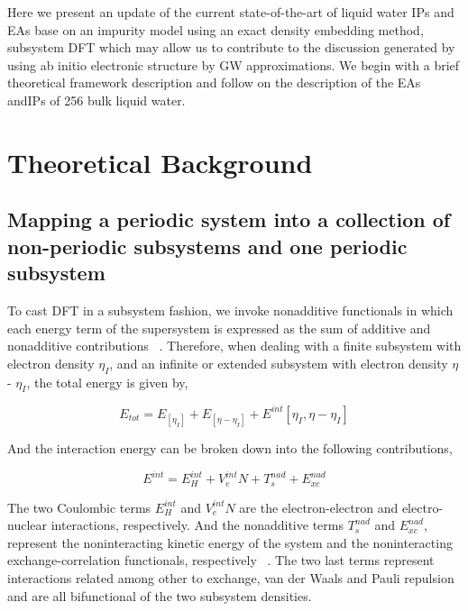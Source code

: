 \documentclass[12pt,a4paper]{article}
\begin{document}
Here we present an update of the current state-of-the-art of liquid water IPs and EAs base on an impurity model using an exact density
embedding method, subsystem DFT which may allow us to contribute to the discussion generated by using ab initio electronic structure
\cite{ambrosio2017electronic, gaiduk2018electron} by GW approximations. We begin with a brief theoretical framework description and follow on the
description of the EAs andIPs of 256 bulk liquid water.


\section{Theoretical Background}

\subsection{Mapping a periodic system into a collection of non-periodic subsystems and one periodic subsystem}

To cast DFT in a subsystem fashion, we invoke nonadditive functionals in which each energy term of the supersystem is expressed as the sum of additive
and nonadditive contributions ~\cite{martyna1999reciprocal}. Therefore, when dealing with a finite subsystem with electron density $\eta_I$, and an
infinite or extended subsystem with electron density $\eta$ - $\eta_I$, the total energy is given by,

\begin{equation}
	E_{tot} = {E_[{\eta}_I]} + {E_[{\eta} - {\eta}_I]} + {E^{int}[{\eta}_I, {\eta} - {\eta}_I] } 
\end{equation}

And the interaction energy can be broken down into the following contributions,

\begin{equation}
	E^{int} = E^{int}_H + V^{int}_eN + T^{nad}_s + E^{nad}_{xc} 
\end{equation}

The two Coulombic terms $E^{int}_H$ and $V^{int}_eN$ are the electron-electron and electro-nuclear interactions, respectively. And the
nonadditive terms $T^{nad}_s$ and $E^{nad}_{xc}$, represent the noninteracting kinetic energy of the system and the noninteracting
exchange-correlation functionals, respectively ~\cite{krishtal2015subsystem}. The two last terms represent interactions related among other to exchange, van der Waals and Pauli repulsion and are all bifunctional of the two subsystem densities.
\end{document}
